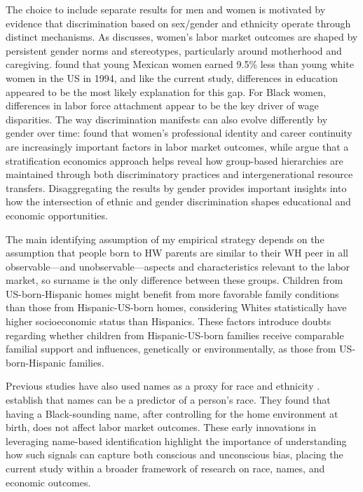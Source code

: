 The choice to include separate results for men and women is motivated by evidence that discrimination based on sex/gender and ethnicity operate through distinct mechanisms. As \textcite{bertrand2020gender} discusses, women's labor market outcomes are shaped by persistent gender norms and stereotypes, particularly around motherhood and caregiving. \textcite{antecol2002relative} found that young Mexican women earned 9.5\% less than young white women in the US in 1994, and like the current study, differences in education appeared to be the most likely explanation for this gap. For Black women, differences in labor force attachment appear to be the key driver of wage disparities. The way discrimination manifests can also evolve differently by gender over time: \textcite{goldin2004making} found that women's professional identity and career continuity are increasingly important factors in labor market outcomes, while \textcite{darity2015tour} argue that a stratification economics approach helps reveal how group-based hierarchies are maintained through both discriminatory practices and intergenerational resource transfers. Disaggregating the results by gender provides important insights into how the intersection of ethnic and gender discrimination shapes educational and economic opportunities.

The main identifying assumption of my empirical strategy depends on the assumption that people born to HW parents are similar to their WH peer in all observable---and unobservable---aspects and characteristics relevant to the labor market, so surname is the only difference between these groups. Children from US-born-Hispanic homes might benefit from more favorable family conditions than those from Hispanic-US-born homes, considering Whites statistically have higher socioeconomic status than Hispanics.  These factors introduce doubts regarding whether children from Hispanic-US-born families receive comparable familial support and influences, genetically or environmentally, as those from US-born-Hispanic families.

Previous studies have also used names as a proxy for race and ethnicity \autocite{fryer2004causes, bertrand2004emily}. \textcite{fryer2004causes} establish that names can be a predictor of a person's race. They found that having a Black-sounding name, after controlling for the home environment at birth, does not affect labor market outcomes. These early innovations in leveraging name-based identification highlight the importance of understanding how such signals can capture both conscious and unconscious bias, placing the current study within a broader framework of research on race, names, and economic outcomes. 

